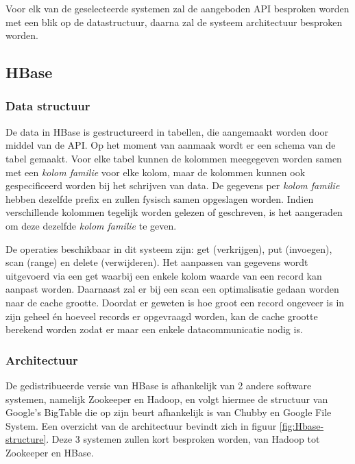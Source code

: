 Voor elk van de geselecteerde systemen zal de aangeboden API besproken worden met een blik op de datastructuur, daarna zal de systeem architectuur besproken worden. 

\subsection{HBase}

\subsubsection{Data structuur}
De data in HBase is gestructureerd in tabellen, die aangemaakt worden door middel van de API. Op het moment van aanmaak wordt er een schema van de tabel gemaakt. Voor elke tabel kunnen de kolommen meegegeven worden samen met een \textit{kolom familie} voor elke kolom, maar de kolommen kunnen ook gespecificeerd worden bij het schrijven van data. De gegevens per \textit{kolom familie} hebben dezelfde prefix en zullen fysisch samen opgeslagen worden. Indien verschillende kolommen tegelijk worden gelezen of geschreven, is het aangeraden om deze dezelfde \textit{kolom familie} te geven. 

De operaties beschikbaar in dit systeem zijn: get (verkrijgen), put (invoegen), scan (range) en delete (verwijderen). Het aanpassen van gegevens wordt uitgevoerd via een get waarbij een enkele kolom waarde van een record kan aanpast worden. Daarnaast zal er bij een scan een optimalisatie gedaan worden naar de cache grootte. Doordat er geweten is hoe groot een record ongeveer is in zijn geheel én hoeveel records er opgevraagd worden, kan de cache grootte berekend worden zodat er maar een enkele datacommunicatie nodig is. 

\subsubsection{Architectuur}
De gedistribueerde versie van HBase\cite{george2011hbase} is afhankelijk van 2 andere software systemen, namelijk Zookeeper\cite{hunt2010zookeeper} en Hadoop\cite{borthakur2007hadoop}, en volgt hiermee de structuur van Google's BigTable\cite{chang2008bigtable} die op zijn beurt afhankelijk is van Chubby\cite{burrows2006chubby} en Google File System\cite{ghemawat2003google}. Een overzicht van de architectuur bevindt zich in figuur \ref{fig:Hbase-structure}. Deze 3 systemen zullen kort besproken worden, van Hadoop tot Zookeeper en HBase. 

